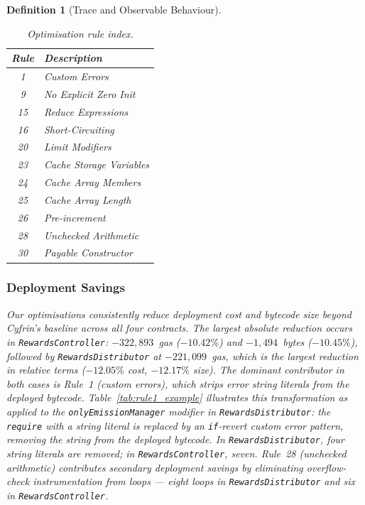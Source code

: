 \documentclass[manuscript,screen,review]{acmart}
\newtheorem{definition}{Definition}
\begin{document}
\begin{definition}[Trace and Observable Behaviour]
\begin{table}[H]
\centering
\caption{Optimisation rule index.}
\label{tab:rules-legend}
\footnotesize
\begin{tabular}{@{}cl@{}}
\toprule
\textbf{Rule} & \textbf{Description} \\
\midrule
1  & Custom Errors \\
9  & No Explicit Zero Init \\
15 & Reduce Expressions \\
16 & Short-Circuiting \\
20 & Limit Modifiers \\
23 & Cache Storage Variables \\
24 & Cache Array Members \\
25 & Cache Array Length \\
26 & Pre-increment \\
28 & Unchecked Arithmetic \\
30 & Payable Constructor \\
\bottomrule
\end{tabular}
\end{table}

\subsubsection{Deployment Savings}
\label{sssec:deploy_savings}

Our optimisations consistently reduce deployment cost and bytecode size beyond Cyfrin's baseline across all four contracts. The largest absolute reduction occurs in \texttt{RewardsController}: $-322{,}893$~gas ($-10.42\%$) and $-1{,}494$~bytes ($-10.45\%$), followed by \texttt{RewardsDistributor} at $-221{,}099$~gas, which is the largest reduction in relative terms ($-12.05\%$ cost, $-12.17\%$ size). The dominant contributor in both cases is Rule~1 (custom errors), which strips error string literals from the deployed bytecode. Table~\ref{tab:rule1_example} illustrates this transformation as applied to the \texttt{onlyEmissionManager} modifier in \texttt{RewardsDistributor}: the \texttt{require} with a string literal is replaced by an \texttt{if}-revert custom error pattern, removing the string from the deployed bytecode. In \texttt{RewardsDistributor}, four string literals are removed; in \texttt{RewardsController}, seven. Rule~28 (unchecked arithmetic) contributes secondary deployment savings by eliminating overflow-check instrumentation from loops --- eight loops in \texttt{RewardsDistributor} and six in \texttt{RewardsController}.


\end{definition}
\end{document}
